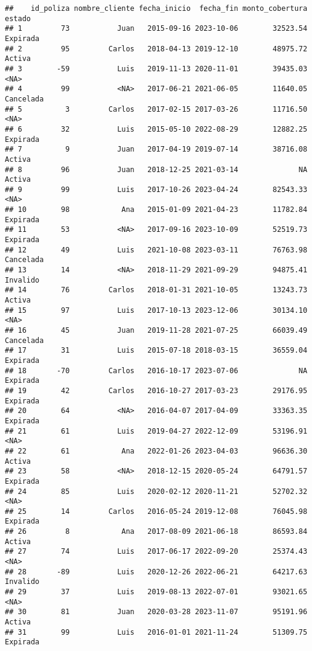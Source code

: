 \documentclass[
]{article}
\begin{document}
\begin{verbatim}
##    id_poliza nombre_cliente fecha_inicio  fecha_fin monto_cobertura    estado
## 1         73           Juan   2015-09-16 2023-10-06        32523.54  Expirada
## 2         95         Carlos   2018-04-13 2019-12-10        48975.72    Activa
## 3        -59           Luis   2019-11-13 2020-11-01        39435.03      <NA>
## 4         99           <NA>   2017-06-21 2021-06-05        11640.05 Cancelada
## 5          3         Carlos   2017-02-15 2017-03-26        11716.50      <NA>
## 6         32           Luis   2015-05-10 2022-08-29        12882.25  Expirada
## 7          9           Juan   2017-04-19 2019-07-14        38716.08    Activa
## 8         96           Juan   2018-12-25 2021-03-14              NA    Activa
## 9         99           Luis   2017-10-26 2023-04-24        82543.33      <NA>
## 10        98            Ana   2015-01-09 2021-04-23        11782.84  Expirada
## 11        53           <NA>   2017-09-16 2023-10-09        52519.73  Expirada
## 12        49           Luis   2021-10-08 2023-03-11        76763.98 Cancelada
## 13        14           <NA>   2018-11-29 2021-09-29        94875.41  Invalido
## 14        76         Carlos   2018-01-31 2021-10-05        13243.73    Activa
## 15        97           Luis   2017-10-13 2023-12-06        30134.10      <NA>
## 16        45           Juan   2019-11-28 2021-07-25        66039.49 Cancelada
## 17        31           Luis   2015-07-18 2018-03-15        36559.04  Expirada
## 18       -70         Carlos   2016-10-17 2023-07-06              NA  Expirada
## 19        42         Carlos   2016-10-27 2017-03-23        29176.95  Expirada
## 20        64           <NA>   2016-04-07 2017-04-09        33363.35  Expirada
## 21        61           Luis   2019-04-27 2022-12-09        53196.91      <NA>
## 22        61            Ana   2022-01-26 2023-04-03        96636.30    Activa
## 23        58           <NA>   2018-12-15 2020-05-24        64791.57  Expirada
## 24        85           Luis   2020-02-12 2020-11-21        52702.32      <NA>
## 25        14         Carlos   2016-05-24 2019-12-08        76045.98  Expirada
## 26         8            Ana   2017-08-09 2021-06-18        86593.84    Activa
## 27        74           Luis   2017-06-17 2022-09-20        25374.43      <NA>
## 28       -89           Luis   2020-12-26 2022-06-21        64217.63  Invalido
## 29        37           Luis   2019-08-13 2022-07-01        93021.65      <NA>
## 30        81           Juan   2020-03-28 2023-11-07        95191.96    Activa
## 31        99           Luis   2016-01-01 2021-11-24        51309.75  Expirada

\end{verbatim}
\end{document}

